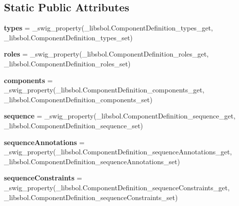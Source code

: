 \subsection*{Static Public Attributes}
\begin{DoxyCompactItemize}
\item 
{\bfseries types} = \+\_\+swig\+\_\+property(\+\_\+libsbol.\+Component\+Definition\+\_\+types\+\_\+get, \+\_\+libsbol.\+Component\+Definition\+\_\+types\+\_\+set)\hypertarget{classsbol_1_1libsbol_1_1_component_definition_a7dd13d02996429b67c134ea0fa88e08c}{}\label{classsbol_1_1libsbol_1_1_component_definition_a7dd13d02996429b67c134ea0fa88e08c}

\item 
{\bfseries roles} = \+\_\+swig\+\_\+property(\+\_\+libsbol.\+Component\+Definition\+\_\+roles\+\_\+get, \+\_\+libsbol.\+Component\+Definition\+\_\+roles\+\_\+set)\hypertarget{classsbol_1_1libsbol_1_1_component_definition_ad137d9e3f64de54247512ae4d68a6e71}{}\label{classsbol_1_1libsbol_1_1_component_definition_ad137d9e3f64de54247512ae4d68a6e71}

\item 
{\bfseries components} = \+\_\+swig\+\_\+property(\+\_\+libsbol.\+Component\+Definition\+\_\+components\+\_\+get, \+\_\+libsbol.\+Component\+Definition\+\_\+components\+\_\+set)\hypertarget{classsbol_1_1libsbol_1_1_component_definition_ab384c2f8615cbc280c31fc03926b3e87}{}\label{classsbol_1_1libsbol_1_1_component_definition_ab384c2f8615cbc280c31fc03926b3e87}

\item 
{\bfseries sequence} = \+\_\+swig\+\_\+property(\+\_\+libsbol.\+Component\+Definition\+\_\+sequence\+\_\+get, \+\_\+libsbol.\+Component\+Definition\+\_\+sequence\+\_\+set)\hypertarget{classsbol_1_1libsbol_1_1_component_definition_a5c051417c0aa9f4d5fe3479281a3d6e0}{}\label{classsbol_1_1libsbol_1_1_component_definition_a5c051417c0aa9f4d5fe3479281a3d6e0}

\item 
{\bfseries sequence\+Annotations} = \+\_\+swig\+\_\+property(\+\_\+libsbol.\+Component\+Definition\+\_\+sequence\+Annotations\+\_\+get, \+\_\+libsbol.\+Component\+Definition\+\_\+sequence\+Annotations\+\_\+set)\hypertarget{classsbol_1_1libsbol_1_1_component_definition_ae9c5beab1424408d7d0eaa3091c6de09}{}\label{classsbol_1_1libsbol_1_1_component_definition_ae9c5beab1424408d7d0eaa3091c6de09}

\item 
{\bfseries sequence\+Constraints} = \+\_\+swig\+\_\+property(\+\_\+libsbol.\+Component\+Definition\+\_\+sequence\+Constraints\+\_\+get, \+\_\+libsbol.\+Component\+Definition\+\_\+sequence\+Constraints\+\_\+set)\hypertarget{classsbol_1_1libsbol_1_1_component_definition_ad437899d9d288901a0cad51d053ef379}{}\label{classsbol_1_1libsbol_1_1_component_definition_ad437899d9d288901a0cad51d053ef379}

\end{DoxyCompactItemize}


